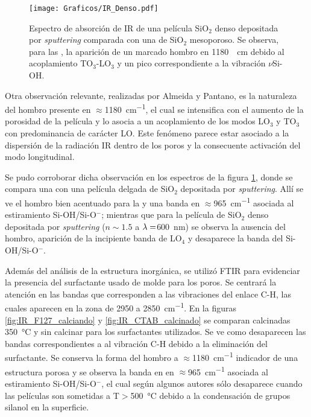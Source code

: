 				 \begin{figure}[!b]
						\begin{center}
						\texttt{[image: Graficos/IR\_Denso.pdf]}
						\caption[FTIR SiO$_2$ denso y SiO$_2$ mesoporoso.]{Espectro de absorción de IR de una película SiO$_2$ denso depositada por \textit{sputtering }comparada con una de SiO$_2$ mesoporoso. Se observa, para las \pdm, la aparición de un marcado hombro en \SI{1180}{\per\cm} debido al acoplamiento TO$_3$-LO$_3$ y un pico correspondiente a la vibración $\nu$Si-OH.}
						\label{fig:IR-denso}
						\end{center}
						\end{figure}

		 Otra observación relevante, realizadas por Almeida y Pantano\cite{Almeida1990}, es la naturaleza del hombro presente en $\approx$\SI{1180}{\cm^{-1}}, el cual se intensifica con el aumento de la porosidad de la película y lo asocia a un acoplamiento de los modos LO$_3$ y TO$_3$ con predominancia de carácter LO. Este fenómeno parece estar asociado a la dispersión de la radiación IR dentro de los poros y la consecuente activación del modo longitudinal.	
			
		 Se pudo corroborar dicha observación en los espectros de la figura \ref{fig:IR-denso}, donde se compara una \pdm\space con una película delgada de SiO$_2$ depositada por \textit{sputtering}.  Allí se ve el hombro bien acentuado para la \pdm\space y una banda en $\approx$\SI{965}{\cm^{-1}} asociada al estiramiento Si-OH/Si-O$^-$; mientras que para la película de SiO$_2$ denso depositada por \textit{sputtering} ($n\sim 1.5$ a $\lambda\index{longitud de onda}=$\SI{600}{\nm})\cite{Vergohl1999} se observa la ausencia del hombro, aparición de la incipiente banda de LO$_4$ y desaparece la banda del Si-OH/Si-O$^-$.

		 Además del análisis de la estructura inorgánica, se utilizó FTIR para evidenciar la presencia del surfactante usado de molde para los poros. Se centrará la atención en las bandas que corresponden a las vibraciones del enlace C-H, las cuales aparecen en la zona de 2950 a \SI{2850}{\cm^{-1}}. En la figuras \ref{fig:IR_F127_calciando} y \ref{fig:IR_CTAB_calcinado} se comparan \pdm\space calcinadas \SI{350}{\celsius} y sin calcinar para los surfactantes utilizados. Se ve como desaparecen las bandas correspondientes a al vibración C-H debido a la eliminación del surfactante. Se conserva la forma del hombro a $\approx$\SI{1180}{\cm^{-1}} indicador de una estructura porosa y se observa la banda en en $\approx$\SI{965}{\cm^{-1}} asociada al estiramiento Si-OH/Si-O$^-$, el cual según algunos autores sólo desaparece cuando las películas son sometidas a T$>$\SI{500}{\celsius} debido a la condensación de grupos silanol en la superficie.\cite{Innocenzi2003,Almeida1990,Bertoluzza1982}

